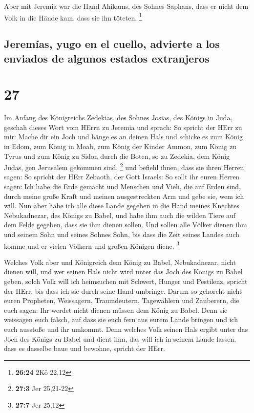  Aber mit Jeremia war die Hand Ahikams, des Sohnes
Saphans, dass er nicht dem Volk in die Hände kam, dass sie ihn töteten.
\footnote{\textbf{26:24} 2Kö 22,12}

\hypertarget{jeremuxedas-yugo-en-el-cuello-advierte-a-los-enviados-de-algunos-estados-extranjeros}{%
\subsection{Jeremías, yugo en el cuello, advierte a los enviados de
algunos estados
extranjeros}\label{jeremuxedas-yugo-en-el-cuello-advierte-a-los-enviados-de-algunos-estados-extranjeros}}

\hypertarget{section-26}{%
\section{27}\label{section-26}}

 Im Anfang des Königreichs Zedekias, des Sohnes Josias,
des Königs in Juda, geschah dieses Wort vom HErrn zu Jeremia und sprach:
 So spricht der HErr zu mir: Mache dir ein Joch und hänge
es an deinen Hals  und schicke es zum König in Edom, zum
König in Moab, zum König der Kinder Ammon, zum König zu Tyrus und zum
König zu Sidon durch die Boten, so zu Zedekia, dem König Judas, gen
Jerusalem gekommen sind, \footnote{\textbf{27:3} Jer 25,21-22}
 und befiehl ihnen, dass sie ihren Herren sagen: So
spricht der HErr Zebaoth, der Gott Israels: So sollt ihr euren Herren
sagen:  Ich habe die Erde gemacht und Menschen und Vieh,
die auf Erden sind, durch meine große Kraft und meinen ausgestreckten
Arm und gebe sie, wem ich will.  Nun aber habe ich alle
diese Lande gegeben in die Hand meines Knechtes Nebukadnezar, des Königs
zu Babel, und habe ihm auch die wilden Tiere auf dem Felde gegeben, dass
sie ihm dienen sollen.  Und sollen alle Völker dienen ihm
und seinem Sohn und seines Sohnes Sohn, bis dass die Zeit seines Landes
auch komme und er vielen Völkern und großen Königen diene. \footnote{\textbf{27:7}
  Jer 25,12}

 Welches Volk aber und Königreich dem König zu Babel,
Nebukadnezar, nicht dienen will, und wer seinen Hals nicht wird unter
das Joch des Königs zu Babel geben, solch Volk will ich heimsuchen mit
Schwert, Hunger und Pestilenz, spricht der HErr, bis dass ich sie durch
seine Hand umbringe.  Darum so gehorcht nicht euren
Propheten, Weissagern, Traumdeutern, Tagewählern und Zauberern, die euch
sagen: Ihr werdet nicht dienen müssen dem König zu Babel.
 Denn sie weissagen euch falsch, auf dass sie euch fern
aus eurem Lande bringen und ich euch ausstoße und ihr umkommt.
 Denn welches Volk seinen Hals ergibt unter das Joch des
Königs zu Babel und dient ihm, das will ich in seinem Lande lassen, dass
es dasselbe baue und bewohne, spricht der HErr.

